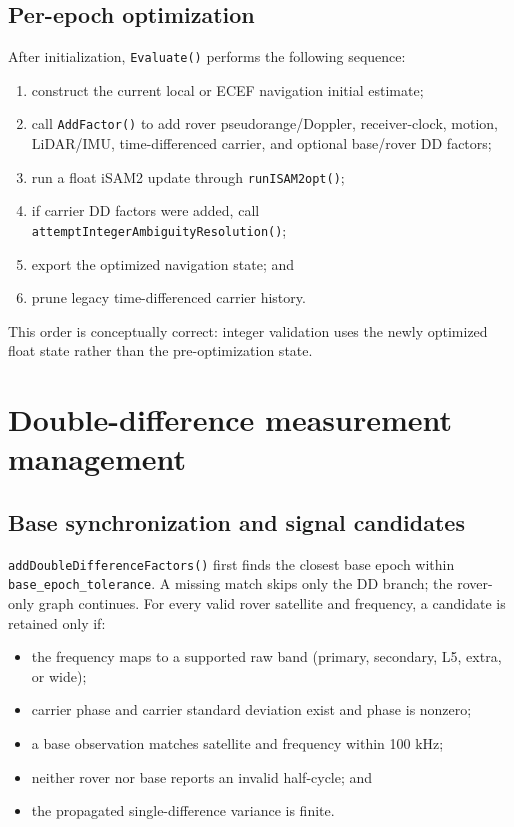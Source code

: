 \documentclass[11pt,a4paper]{article}
\newcommand{\code}[1]{\texttt{#1}}
\begin{document}
\subsection{Per-epoch optimization}

After initialization, \code{Evaluate()} performs the following sequence:
\begin{enumerate}
  \item construct the current local or ECEF navigation initial estimate;
  \item call \code{AddFactor()} to add rover pseudorange/Doppler, receiver-clock,
        motion, LiDAR/IMU, time-differenced carrier, and optional base/rover DD
        factors;
  \item run a float iSAM2 update through \code{runISAM2opt()};
  \item if carrier DD factors were added, call
        \code{attemptIntegerAmbiguityResolution()};
  \item export the optimized navigation state; and
  \item prune legacy time-differenced carrier history.
\end{enumerate}

This order is conceptually correct: integer validation uses the newly optimized
float state rather than the pre-optimization state.

\section{Double-difference measurement management}

\subsection{Base synchronization and signal candidates}

\code{addDoubleDifferenceFactors()} first finds the closest base epoch within
\code{base\_epoch\_tolerance}.  A missing match skips only the DD branch; the
rover-only graph continues.  For every valid rover satellite and frequency, a
candidate is retained only if:
\begin{itemize}
  \item the frequency maps to a supported raw band (primary, secondary, L5,
        extra, or wide);
  \item carrier phase and carrier standard deviation exist and phase is nonzero;
  \item a base observation matches satellite and frequency within 100 kHz;
  \item neither rover nor base reports an invalid half-cycle; and
  \item the propagated single-difference variance is finite.
\end{itemize}
\end{document}

